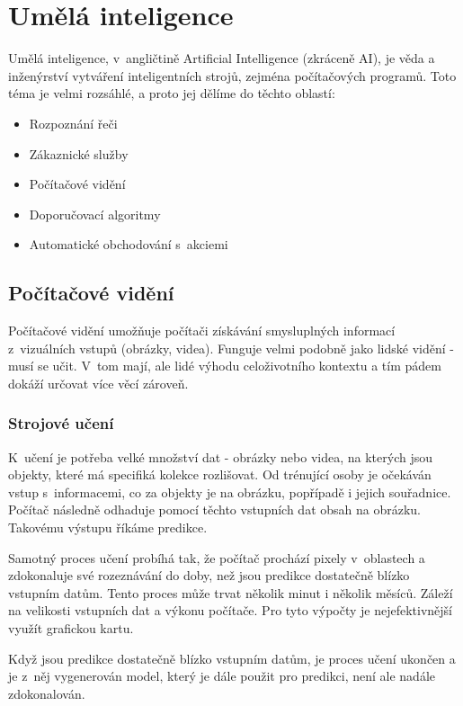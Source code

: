 \section{Umělá inteligence}
Umělá inteligence, v~angličtině Artificial Intelligence (zkráceně AI), je věda a inženýrství vytváření inteligentních strojů, zejména počítačových programů.\cite{What-is-AI} Toto téma je velmi rozsáhlé, a proto jej dělíme do těchto oblastí\cite{IBM-AI}:
\begin{itemize}
	\item Rozpoznání řeči
	\item Zákaznické služby
	\item Počítačové vidění
	\item Doporučovací algoritmy
	\item Automatické obchodování s~akciemi
\end{itemize}

\subsection{Počítačové vidění}
Počítačové vidění umožňuje počítači získávání smysluplných informací z~vizuálních vstupů (obrázky, videa). \cite{IBM-CV} Funguje velmi podobně jako lidské vidění - musí se učit. V~tom mají, ale lidé výhodu celoživotního kontextu a tím pádem dokáží určovat více věcí zároveň.\par

\subsubsection{Strojové učení}
K~učení je potřeba velké množství dat - obrázky nebo videa, na kterých jsou objekty, které má specifiká kolekce rozlišovat. Od trénující osoby je očekáván vstup s~informacemi, co za objekty je na obrázku, popřípadě i jejich souřadnice. Počítač následně odhaduje pomocí těchto vstupních dat obsah na obrázku. Takovému výstupu říkáme predikce.\par
Samotný proces učení probíhá tak, že počítač prochází pixely v~oblastech a zdokonaluje své rozeznávání do doby, než jsou predikce dostatečně blízko vstupním datům. Tento proces může trvat několik minut i několik měsíců. Záleží na velikosti vstupních dat a výkonu počítače. Pro tyto výpočty je nejefektivnější využít grafickou kartu.\par
Když jsou predikce dostatečně blízko vstupním datům, je proces učení ukončen a je z~něj vygenerován model, který je dále použit pro predikci, není ale nadále zdokonalován. 


